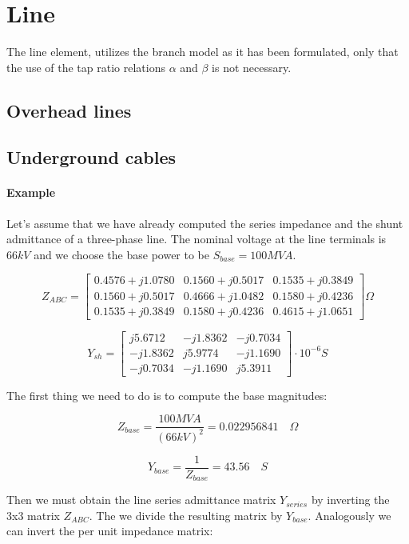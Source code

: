 \documentclass{tufte-book}
\begin{document}
\section{Line}

The line element, utilizes the branch model as it has been formulated, only that the use of the tap ratio relations $\alpha$ and $\beta$ is not necessary.


\subsection{Overhead lines}


\subsection{Underground cables}


\paragraph{Example}

Let's assume that we have already computed the series impedance and the shunt admittance of a three-phase line. The nominal voltage at the line terminals is $66kV$ and we choose the base power to be $S_{base}=100MVA$.

$$
Z_{ABC} = \left[ \begin{array}{ccc}
0.4576 + j 1.0780 & 0.1560 + j0 .5017 & 0.1535 + j 0.3849 \\
0.1560 + j 0.5017 & 0.4666 + j 1.0482 & 0.1580 + j 0.4236 \\ 
0.1535 + j 0.3849 & 0.1580 + j 0.4236 & 0.4615 + j 1.0651
\end{array} \right] \Omega
$$

$$
Y_{sh} = \left[ \begin{array}{ccc}
j5.6712 & -j1.8362 & -j0.7034 \\
-j1.8362 & j5.9774 & -j1.1690 \\ 
-j0.7034 & -j1.1690 & j5.3911
\end{array} \right] \cdot 10^{-6}  S
$$

The first thing we need to do is to compute the base magnitudes:

$$
Z_{base} = \frac{100 MVA}{(66kV)^2} = 0.022956841 \quad \Omega
$$

$$
Y_{base} = \frac{1}{Z_{base}} = 43.56 \quad S
$$

Then we must obtain the line series admittance matrix $Y_{series}$ by inverting the 3x3 matrix $Z_{ABC}$. The we divide the resulting matrix by $Y_{base}$. Analogously we can invert the per unit impedance matrix:
\end{document}
